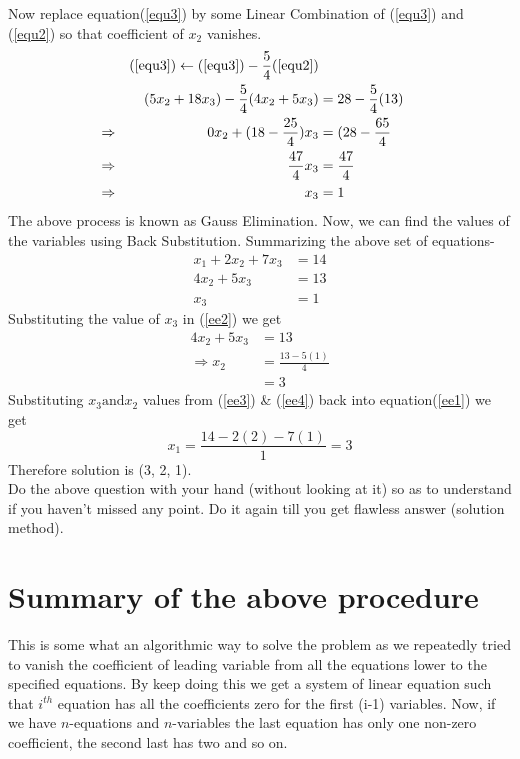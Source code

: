 \documentclass{article}
\begin{document}
Now replace equation(\ref{equ3}) by some Linear Combination of (\ref{equ3}) and (\ref{equ2}) so that coefficient of \(x_2\) vanishes.\\
\begin{align}
    && (\ref{equ3}) \leftarrow (\ref{equ3}) - \frac{5}{4}(\ref{equ2})\nonumber\\
    && (5x_2 + 18x_3) - \frac{5}{4}(4x_2 +5x_3) &= 28-\frac{5}{4}(13)\nonumber\\
    \Rightarrow && 0x_2 + (18 - \frac{25}{4})x_3 &= (28 - \frac{65}{4}\nonumber\\
    \Rightarrow && \frac{47}{4}x_3 &= \frac{47}{4}\nonumber\\
    \Rightarrow && x_3 &= 1\nonumber
\end{align}
The above process is known as Gauss Elimination. Now, we can find the values of the variables using Back Substitution. Summarizing the above set of equations-
\begin{align}
    x_1 + 2x_2 + 7x_3 &= 14\label{ee1}\\
    4x_2 + 5x_3 & = 13 \label{ee2}\\
    x_3 &= 1\label{ee3}
\end{align}
Substituting the value of \(x_3\) in (\ref{ee2}) we get
\begin{align}
    4x_2 + 5x_3 &= 13 \nonumber\\
    \Rightarrow x_2 &= \frac{13-5(1)}{4} \nonumber\\
    &= 3 \label{ee4}
\end{align}
Substituting \(x_3 \text{and} x_2\) values from (\ref{ee3}) \& (\ref{ee4}) back into equation(\ref{ee1}) we get 
\[
    x_1 = \frac{14-2(2)-7(1)}{1} = 3
\]
Therefore solution is (3, 2, 1).\\

Do the above question with your hand (without looking at it) so as to understand if you haven't missed any point. Do it again till you get flawless answer (solution method).\\

\section{Summary of the above procedure}
This is some what an algorithmic way to solve the problem as we repeatedly tried to vanish the coefficient of leading variable from all the equations lower to the specified equations. By keep doing this we get a system of linear equation such that $i^{th}$ equation has all the coefficients zero for the first (i-1) variables. Now, if we have $n$-equations and $n$-variables the last equation has only one non-zero coefficient, the second last has two and so on.\\
\end{document}
